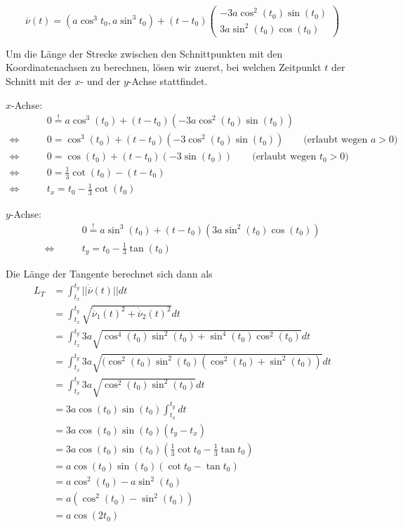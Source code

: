 \documentclass[a4paper,german,12pt,smallheadings]{scrartcl}
\begin{document}
\begin{equation*}
  \overline{\nu}(t) = (a \cos^3 t_0, a \sin^3 t_0) + (t-t_0) \begin{pmatrix} -3a \cos^2(t_0) \sin(t_0) \\ 3a \sin^2(t_0) \cos(t_0) \end{pmatrix}
\end{equation*}

Um die Länge der Strecke zwischen den Schnittpunkten mit den Koordinatenachsen
zu berechnen, lösen wir zuerst, bei welchen Zeitpunkt $t$ der Schnitt mit der
$x$- und der $y$-Achse stattfindet.

$x$-Achse:
\begin{align*}
  &0 \overset{!}{=} a \cos^3(t_0) + (t-t_0)(-3a \cos^2(t_0) \sin(t_0)) \\
  \Leftrightarrow\qquad &0 = \cos^3(t_0) + (t-t_0)(-3 \cos^2(t_0) \sin(t_0)) \qquad \text{(erlaubt wegen $a>0$)}\\
  \Leftrightarrow\qquad &0 = \cos(t_0) + (t-t_0)(-3 \sin(t_0)) \qquad \text{(erlaubt wegen $t_0 > 0$)}\\
  \Leftrightarrow\qquad &0 = \frac{1}{3} \cot(t_0) - (t - t_0) \\
  \Leftrightarrow\qquad &t_x = t_0 - \frac{1}{3} \cot(t_0)
\end{align*}

$y$-Achse:
\begin{align*}
  &0 \overset{!}{=} a \sin^3(t_0) + (t-t_0)(3a \sin^2(t_0) \cos(t_0)) \\
  \Leftrightarrow\qquad &t_y = t_0 - \frac{1}{3} \tan(t_0)
\end{align*}

Die Länge der Tangente berechnet sich dann als
\begin{align*}
  L_T &= \int_{t_x}^{t_y} ||\dot{\overline{\nu}}(t)|| dt \\
      &= \int_{t_x}^{t_y} \sqrt{\dot{\overline{\nu}}_1(t)^2 + \dot{\overline{\nu}}_2(t)^2} dt \\
      &= \int_{t_x}^{t_y} 3a \sqrt{\cos^4(t_0)\sin^2(t_0) + \sin^4(t_0) \cos^2(t_0)} dt \\
      &= \int_{t_x}^{t_y} 3a \sqrt{(\cos^2(t_0)\sin^2(t_0) (\cos^2(t_0) + \sin^2(t_0))} dt \\
      &= \int_{t_x}^{t_y} 3a \sqrt{\cos^2(t_0)\sin^2(t_0)} dt \\
      &= 3a \cos(t_0)\sin(t_0) \int_{t_x}^{t_y} dt \\
      &= 3a \cos(t_0)\sin(t_0) (t_y - t_x) \\
      &= 3a \cos(t_0)\sin(t_0) (\frac{1}{3} \cot t_0 - \frac{1}{3} \tan t_0) \\
      &= a \cos(t_0) \sin(t_0) (\cot t_0 - \tan t_0) \\
      &= a \cos^2(t_0) - a \sin^2(t_0) \\
      &= a (\cos^2(t_0) - \sin^2(t_0)) \\
      &= a \cos(2 t_0)
\end{align*}


\begin{equation*}
\end{equation*}
\end{document}
